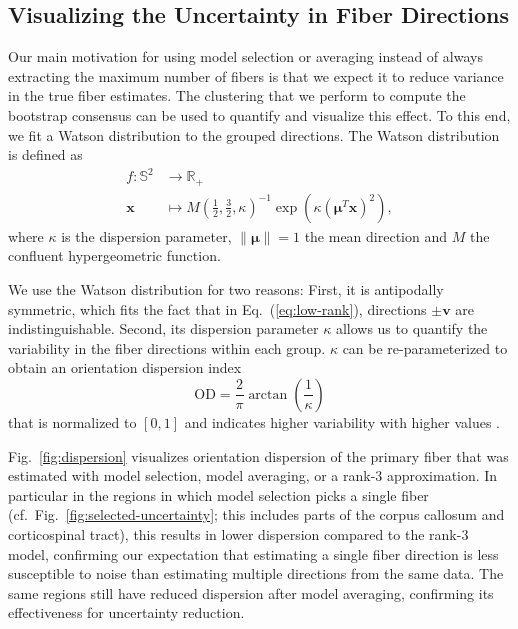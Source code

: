 \subsection{Visualizing the Uncertainty in Fiber Directions}
\label{sec:vis-uncertainty-reduction}

Our main motivation for using model selection or averaging instead of always extracting the maximum number of fibers is that we expect it to reduce variance in the true fiber estimates. The clustering that we perform to compute the bootstrap consensus can be used to quantify and visualize this effect. To this end, we fit a Watson
distribution to the grouped directions. The Watson distribution is defined as  \cite{jupp_mardia_1999}
\begin{align*}
	f : \mathbb{S}^2 & \longrightarrow  \mathbb{R}_+ \\
	\mathbf{x} & \longmapsto  M \left( \frac{1}{2}, \frac{3}{2} , \kappa
	\right)^{-1} \exp \left(  \kappa
	\left( \mathbf{\mu}^T \mathbf{x} \right)^2 
	\right) 	,  
\end{align*}
where $\kappa$ is the dispersion parameter, $\| \mathbf{\mu} \| = 1$ the
mean direction and $M$ the confluent hypergeometric function. 

We use the Watson distribution for two reasons: First, it is antipodally symmetric,
which fits the fact that in Eq.~(\ref{eq:low-rank}), directions $\pm \mathbf{v}$
are indistinguishable. Second, its dispersion parameter $\kappa$ allows us to quantify the variability in the fiber directions within each group. $\kappa$ can be re-parameterized to obtain an orientation dispersion index
\[ \mathrm{OD} = \frac{2}{\pi} \arctan \left( \frac{1}{\kappa} \right) \]
that is normalized to $[0,1]$ and indicates higher variability with higher values \cite{dispersionParameter}.

Fig.~\ref{fig:dispersion} visualizes orientation dispersion of the primary fiber that was estimated with model selection, model averaging, or a rank-3 approximation. In particular in the regions in which model selection picks a single fiber (cf.\ Fig.~\ref{fig:selected-uncertainty}; this includes parts of the corpus callosum and corticospinal tract), this results in lower dispersion 
compared to the rank-$3$ model, confirming our expectation that estimating a single fiber direction is less susceptible to noise than estimating multiple directions from the same data. The same regions still have reduced dispersion after model averaging, confirming its effectiveness for uncertainty reduction.




